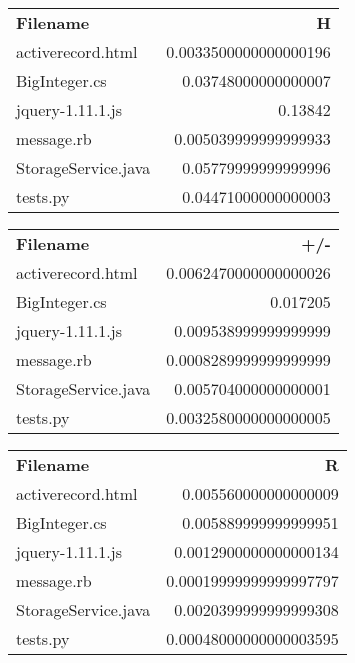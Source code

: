\begin{longtable}{l r}
\textbf{Filename} &  \textbf{H} \\
{activerecord.html} & 0.0033500000000000196  \\
{BigInteger.cs} & 0.03748000000000007  \\
{jquery-1.11.1.js} & 0.13842  \\
{message.rb} & 0.005039999999999933  \\
{StorageService.java} & 0.05779999999999996  \\
{tests.py} & 0.04471000000000003  \\
\end{longtable}
\begin{longtable}{l r}
\textbf{Filename} &  \textbf{+/-} \\
{activerecord.html} & 0.0062470000000000026  \\
{BigInteger.cs} & 0.017205  \\
{jquery-1.11.1.js} & 0.009538999999999999  \\
{message.rb} & 0.0008289999999999999  \\
{StorageService.java} & 0.005704000000000001  \\
{tests.py} & 0.0032580000000000005  \\
\end{longtable}
\begin{longtable}{l r}
\textbf{Filename} &  \textbf{R} \\
{activerecord.html} & 0.005560000000000009  \\
{BigInteger.cs} & 0.005889999999999951  \\
{jquery-1.11.1.js} & 0.0012900000000000134  \\
{message.rb} & 0.00019999999999997797  \\
{StorageService.java} & 0.0020399999999999308  \\
{tests.py} & 0.00048000000000003595  \\
\end{longtable}
